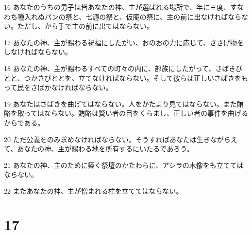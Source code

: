 \par 16 あなたのうちの男子は皆あなたの神、主が選ばれる場所で、年に三度、すなわち種入れぬパンの祭と、七週の祭と、仮庵の祭に、主の前に出なければならない。ただし、から手で主の前に出てはならない。
\par 17 あなたの神、主が賜わる祝福にしたがい、おのおの力に応じて、ささげ物をしなければならない。
\par 18 あなたの神、主が賜わるすべての町々の内に、部族にしたがって、さばきびとと、つかさびととを、立てなければならない。そして彼らは正しいさばきをもって民をさばかなければならない。
\par 19 あなたはさばきを曲げてはならない。人をかたより見てはならない。また賄賂を取ってはならない。賄賂は賢い者の目をくらまし、正しい者の事件を曲げるからである。
\par 20 ただ公義をのみ求めなければならない。そうすればあなたは生きながらえて、あなたの神、主が賜わる地を所有するにいたるであろう。
\par 21 あなたの神、主のために築く祭壇のかたわらに、アシラの木像をも立ててはならない。
\par 22 またあなたの神、主が憎まれる柱を立ててはならない。

\chapter{17}


